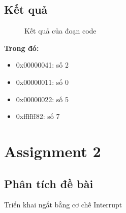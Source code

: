 \documentclass[a4paper,12pt]{article}
\begin{document}
	\subsection{Kết quả}
	\FloatBarrier
	\begin{figure}[ht!]
		\centerline{}
		\caption{Kết quả của đoạn code}
		\label{fig:ass1}
	\end{figure}
	\noindent
	\textbf{Trong đó:}
	\begin{itemize}
		\item 0x00000041: số 2
		\item 0x00000011: số 0
		\item 0x00000022: số 5
		\item 0xffffff82: số 7
	\end{itemize}
\clearpage
\section{Assignment 2}
\subsection{Phân tích đề bài}
Triển khai ngắt bằng cơ chế Interrupt
\end{document}
